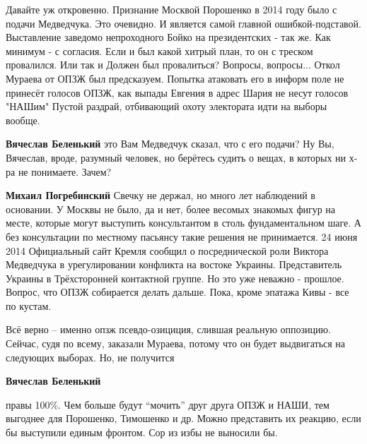  
 
 
 
 
\zzSecCmt

\begin{itemize} %

Давайте уж откровенно. Признание Москвой Порошенко в 2014 году было с подачи Медведчука.
Это очевидно.
И является самой главной ошибкой-подставой.
Выставление заведомо непроходного Бойко на президентских - так же. Как минимум - с согласия.
Если и был какой хитрый план, то он с треском провалился.
Или так и Должен был провалиться?
Вопросы, вопросы...
Откол Мураева от ОПЗЖ был предсказуем.
Попытка атаковать его в информ поле не принесёт голосов ОПЗЖ, как выпады Евгения в адрес Шария не несут голосов "НАШим"
Пустой раздрай, отбивающий охоту электората идти на выборы вообще.

\begin{itemize} %
\textbf{Вячеслав Беленький} это Вам Медведчук сказал, что с его подачи? Ну Вы, Вячеслав, вроде, разумный человек, но берётесь судить о вещах, в которых ни х-ра не понимаете. Зачем?

\textbf{Михаил Погребинский}
Свечку не держал, но много лет наблюдений в основании.
У Москвы не было, да и нет, более весомых знакомых фигур на месте, которые могут выступить консультантом в столь фундаментальном шаге.
А без консультации по местному пасьянсу такие решения не принимается.
24 июня 2014
Официальный сайт Кремля сообщил о посреднической роли Виктора Медведчука в урегулировании конфликта на востоке Украины.
Представитель Украины в Трёхсторонней контактной группе.
Но это уже неважно - прошлое.
Вопрос, что ОПЗЖ собирается делать дальше.
Пока, кроме эпатажа Кивы - все по кустам.


Всё верно – именно опзж псевдо-озициция, слившая реальную оппозицию. Сейчас,
судя по всему, заказали Мураева, потому что он будет выдвигаться на следующих
выборах. Но, не получится

\textbf{Вячеслав Беленький} 

правы 100\%. Чем больше будут \enquote{мочить} друг друга ОПЗЖ и НАШИ, тем выгоднее для
Порошенко, Тимошенко и др. Можно представить их реакцию, если бы выступили
единым фронтом. Сор из избы не выносили бы.


\end{itemize}
\end{itemize}
